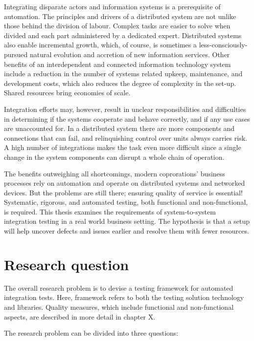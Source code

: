\documentclass[12pt,a4paper,oneside,pdftex]{report}
\begin{document}
Integrating disparate actors and information systems is a prerequisite of automation. The principles and drivers of  a distributed system are not unlike those behind the division of labour. Complex tasks are easier to solve when divided and each part administered by a dedicated expert. Distributed systems also enable incremental growth, which, of course, is sometimes a less-consciously-pursued natural evolution and accretion of new information services. Other benefits of an interdependent and connected information technology system include a reduction in the number of systems related upkeep, maintenance, and development costs, which also reduces the degree of complexity in the set-up. Shared resources bring economies of scale.

Integration efforts may, however, result in unclear responsibilities and difficulties in determining if the systems cooperate and behave correctly, and if any use cases are unaccounted for. In a distributed system there are more components and connections that can fail, and relinquishing control over units always carries risk. A high number of integrations makes the task even more difficult since a single change in the system components can disrupt a whole chain of operation.

The benefits outweighing all shortcomings, modern coprorations' business processes rely on automation and operate on distributed systems and networked devices. But the problems are still there; ensuring quality of service is essential! Systematic, rigorous, and automated testing, both functional and non-functional, is required. This thesis examines the requirements of system-to-system integration testing in a real world business setting. The hypothesis is that a setup will help uncover defects and issues earlier and resolve them with fewer resources.

\section{Research question}

The overall research problem is to devise a testing framework for automated integration tests. Here, framework refers to both the testing solution technology and libraries. Quality measures, which include functional and non-functional aspects, are described in more detail in chapter X. %

The research problem can be divided into three questions: \\
\end{document}

